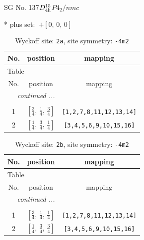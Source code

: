 \documentclass[fleqn,8pt]{jsarticle}
\begin{document}
\setcounter{MaxMatrixCols}{32}

\renewcommand{\tablename}{Table~}
\renewcommand{\figurename}{Figure~}
\begin{center}
\LARGE
SG No. 137\quad$D_{\rm 4h}^{15}$\quad$P4_2/nmc$\quad[ tetragonal ]
\end{center}
* plus set:\,\,\,$+\left[ 0,\, 0,\, 0 \right]$
\renewcommand{\arraystretch}{1.2}
\begin{longtable}{ccc}
\caption{Wyckoff site: {\tt 2a}, site symmetry: {\tt -4m2}}
 \\
 \hline \hline
No. & position & mapping \\ \hline \endfirsthead

\multicolumn{2}{l}{\tablename\ \thetable{}} \\
 \hline \hline
No. & position & mapping \\ \hline \endhead

 \hline \hline
\multicolumn{2}{r}{\footnotesize\it continued ...} \\ \endfoot

 \hline \hline
\multicolumn{2}{r}{} \\ \endlastfoot

1 & $\left[ \frac{3}{4},\, \frac{1}{4},\, \frac{3}{4} \right]$ & {\tt [1,2,7,8,11,12,13,14]} \\ \hline
2 & $\left[ \frac{1}{4},\, \frac{3}{4},\, \frac{1}{4} \right]$ & {\tt [3,4,5,6,9,10,15,16]} \\
\end{longtable}
\renewcommand{\arraystretch}{1.2}
\begin{longtable}{ccc}
\caption{Wyckoff site: {\tt 2b}, site symmetry: {\tt -4m2}}
 \\
 \hline \hline
No. & position & mapping \\ \hline \endfirsthead

\multicolumn{2}{l}{\tablename\ \thetable{}} \\
 \hline \hline
No. & position & mapping \\ \hline \endhead

 \hline \hline
\multicolumn{2}{r}{\footnotesize\it continued ...} \\ \endfoot

 \hline \hline
\multicolumn{2}{r}{} \\ \endlastfoot

1 & $\left[ \frac{3}{4},\, \frac{1}{4},\, \frac{1}{4} \right]$ & {\tt [1,2,7,8,11,12,13,14]} \\ \hline
2 & $\left[ \frac{1}{4},\, \frac{3}{4},\, \frac{3}{4} \right]$ & {\tt [3,4,5,6,9,10,15,16]} \\
\end{longtable}
\end{document}
